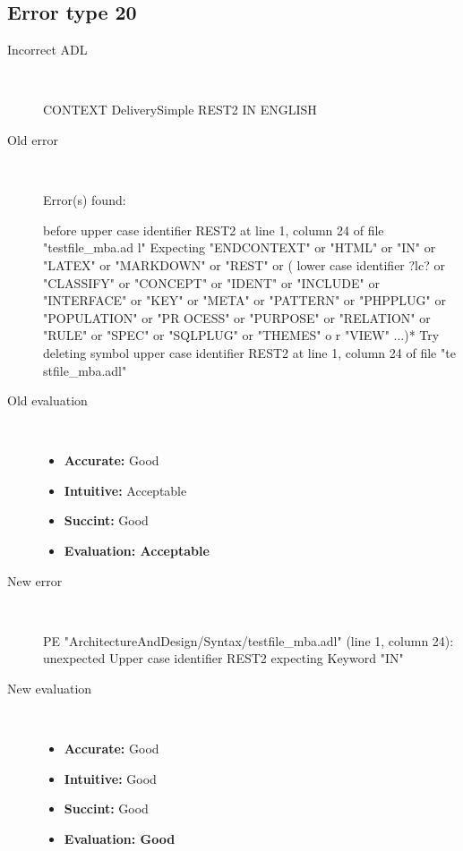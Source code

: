 \hrulefill

\subsection{Error type 20}
  \begin{description}
  \item[Incorrect ADL]~\\
\begin{adl}
CONTEXT DeliverySimple REST2 IN ENGLISH \end{adl}
  \item[Old error]~\\
\begin{haskell}
Error(s) found:

before upper case identifier REST2 at line 1, column 24 of file "testfile_mba.ad
l"
Expecting "ENDCONTEXT" or "HTML" or "IN" or "LATEX" or "MARKDOWN" or "REST" or (
lower case identifier ?lc? or "CLASSIFY" or "CONCEPT" or "IDENT" or "INCLUDE" or
 "INTERFACE" or "KEY" or "META" or "PATTERN" or "PHPPLUG" or "POPULATION" or "PR
OCESS" or "PURPOSE" or "RELATION" or "RULE" or "SPEC" or "SQLPLUG" or "THEMES" o
r "VIEW" ...)*
Try deleting symbol upper case identifier REST2 at line 1, column 24 of file "te
stfile_mba.adl"
\end{haskell}
  \item[Old evaluation]~\\
    \begin{itemize}
    \item \textbf{Accurate:} Good
    \item \textbf{Intuitive:} Acceptable
    \item \textbf{Succint:} Good
    \item \textbf{Evaluation: Acceptable}
    \end{itemize}
  \item[New error]~\\
\begin{haskell}
PE "ArchitectureAndDesign/Syntax/testfile_mba.adl" (line 1, column 24):
unexpected Upper case identifier REST2
expecting Keyword "IN"
\end{haskell}
  \item[New evaluation]~\\
    \begin{itemize}
    \item \textbf{Accurate:} Good
    \item \textbf{Intuitive:} Good
    \item \textbf{Succint:} Good
    \item \textbf{Evaluation: Good
}
    \end{itemize}
  \end{description}


